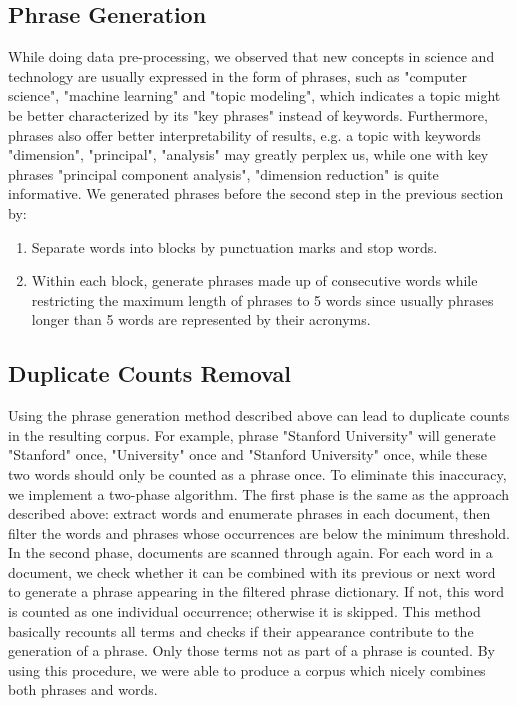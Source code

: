 \documentclass[DIV=calc, paper=letter, fontsize=10pt, twocolumn]{scrartcl}	 %
\begin{document}
\subsection*{Phrase Generation}
While doing data pre-processing, we observed that new concepts in science and technology are usually expressed in the form of phrases, such as "computer science", "machine learning" and "topic modeling", which indicates a topic might be better characterized by its "key phrases" instead of keywords. Furthermore, phrases also offer better interpretability of results, e.g. a topic with keywords {"dimension", "principal", "analysis"} may greatly perplex us, while one with key phrases {"principal component analysis", "dimension reduction"} is quite informative.\newline
We generated phrases before the second step in the previous section by:
\begin{enumerate}
  \item Separate words into blocks by punctuation marks and stop words.
  \item Within each block, generate phrases made up of consecutive words while restricting the maximum length of phrases to 5 words since usually phrases longer than 5 words are represented by their acronyms.
\end{enumerate}
\subsection*{Duplicate Counts Removal}
Using the phrase generation method described above can lead to duplicate counts in the resulting corpus. For example, phrase "Stanford University" will generate "Stanford" once, "University" once and "Stanford University" once, while these two words should only be counted as a phrase once. To eliminate this inaccuracy, we implement a two-phase algorithm. The first phase is the same as the approach described above: extract words and enumerate phrases in each document, then filter the words and phrases whose occurrences are below the minimum threshold. In the second phase, documents are scanned through again. For each word in a document, we check whether it can be combined with its previous or next word to generate a phrase appearing in the filtered phrase dictionary. If not, this word is counted as one individual occurrence; otherwise it is skipped. This method basically recounts all terms and checks if their appearance contribute to the generation of a phrase. Only those terms not as part of a phrase is counted. By using this procedure, we were able to produce a corpus which nicely combines both phrases and words. 
\end{document}
